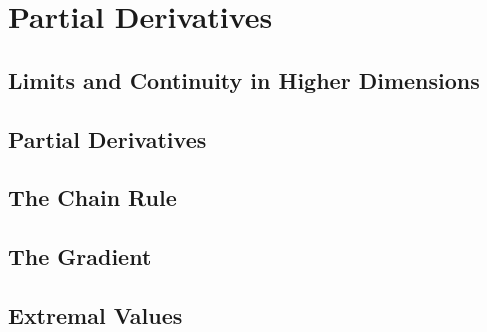 \chapter{Partial Derivatives}

\section{Limits and Continuity in Higher Dimensions}

\section{Partial Derivatives}

\section{The Chain Rule}

\section{The Gradient}

\section{Extremal Values}

